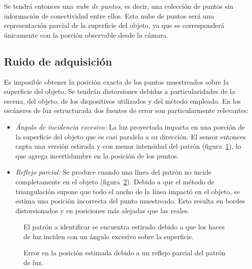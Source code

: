 Se tendrá entonces una \emph{nube de puntos}, es decir, una colección de puntos
sin información de conectividad entre ellos.
Esta nube de puntos será una representación parcial de la superficie del objeto,
ya que se corresponderá únicamente con la porción observable desde la cámara.


\subsection{Ruido de adquisición}
Es imposible obtener la posición exacta de los puntos muestreados sobre la superficie del objeto.
Se tendrán distorsiones debidas a particularidades de la escena, del objeto, de los
dispositivos utilizados y del método empleado.
En los escáneres de luz estructurada dos fuentes de error son particularmente relevantes:
\begin{itemize}
	\item \emph{Ángulo de incidencia excesivo:}
		La luz proyectada impacta en una porción de la superficie del objeto
		que es casi paralela a su dirección.
		El sensor entonces capta una versión estirada y con menor intensidad del patrón (figura~\ref{fig:error_distorsion}),
		lo que agrega incertidumbre en la posición de los puntos.
	\item \emph{Reflejo parcial:}
		Se produce cuando una línea del patrón no incide completamente en el objeto (figura~\ref{fig:error_adquisicion}).
		Debido a que el método de triangulación supone que todo el ancho de la línea impactó en el objeto,
		se estima una posición incorrecta del punto muestreado.
		Esto resulta en bordes distorsionados y en posiciones más alejadas que las reales.\cite{Turk:1994:ZPM:192161.192241}
\end{itemize}

\begin{figure}
	\caption{\label{fig:error_distorsion}El patrón a identificar se encuentra estirado debido a que los haces de luz inciden con un ángulo excesivo sobre la superficie.}
\end{figure}
\begin{figure}
		\caption{\label{fig:error_adquisicion}Error en la posición estimada debido a un reflejo parcial del patrón de luz.}
\end{figure}

\endinput

Representación de los datos

Se puede almacenar más información que simplemente la posición de los puntos muestreados.
Por ejemplo, la intensidad del láser.

